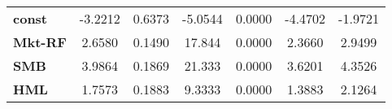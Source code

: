 \begin{center}
\begin{tabular}{lcccccc}
\midrule
\textbf{const}  &      -3.2212       &       0.6373       &     -5.0544     &      0.0000      &      -4.4702      &      -1.9721       \\
\textbf{Mkt-RF} &       2.6580       &       0.1490       &      17.844     &      0.0000      &       2.3660      &       2.9499       \\
\textbf{SMB}    &       3.9864       &       0.1869       &      21.333     &      0.0000      &       3.6201      &       4.3526       \\
\textbf{HML}    &       1.7573       &       0.1883       &      9.3333     &      0.0000      &       1.3883      &       2.1264       \\
\bottomrule
\end{tabular}
\end{center}
